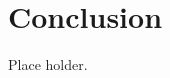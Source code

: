 \documentclass[final,1p,times]{elsarticle}
\begin{document}
\section{Conclusion}
Place holder.














\end{document}
